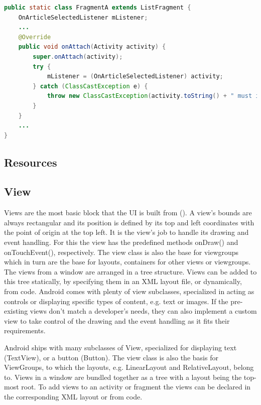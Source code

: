 \begin{lstlisting}[language=JAVA, caption=Example code for enforcing the implementation of a callback interface, label=lst:callback_interface]
public static class FragmentA extends ListFragment {
    OnArticleSelectedListener mListener;
    ...
    @Override
    public void onAttach(Activity activity) {
        super.onAttach(activity);
        try {
            mListener = (OnArticleSelectedListener) activity;
        } catch (ClassCastException e) {
            throw new ClassCastException(activity.toString() + " must implement OnArticleSelectedListener");
        }
    }
    ...
}
\end{lstlisting}

\subsection{Resources}


\subsection{View}
Views are the most basic block that the \gls{UI} is built from (\cite{android_view}). A view's bounds are always rectangular and its position is defined by its top and left coordinates with the point of origin at the top left. It is the view's job to handle its drawing and event handling. For this the view has the predefined methods onDraw() and onTouchEvent(), respectively. The view class is also the base for viewgroups which in turn are the base for layouts, containers for other views or viewgroups.
The views from a window are arranged in a tree structure. Views can be added to this tree statically, by specifying them in an \gls{XML} layout file, or dynamically, from code. Android comes with plenty of view subclasses, specialized in acting as controls or displaying specific types of content, e.g. text or images. If the pre-existing views don't match a developer's needs, they can also implement a custom view to take control of the drawing and the event handling as it fits their requirements.

Android ships with many subclasses of View, specialized for displaying text (TextView), or a button (Button). The view class is also the basis for ViewGroups, to which the layouts, e.g. LinearLayout and RelativeLayout, belong to. Views in a window are bundled together as a tree with a layout being the top-most root. To add views to an activity or fragment the views can be declared in the corresponding \gls{XML} layout or from code. 

